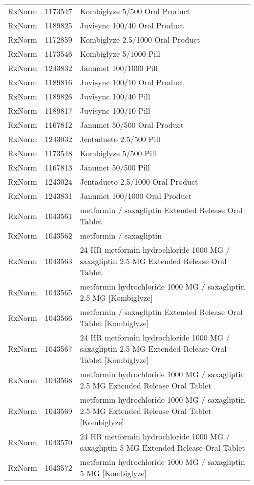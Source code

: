 \begin{longtable}{p{}p{}p{}}
  RxNorm & 1173547 & Kombiglyze 5/500 Oral Product \\ 
  RxNorm & 1189825 & Juvisync 100/40 Oral Product \\ 
  RxNorm & 1172859 & Kombiglyze 2.5/1000 Oral Product \\ 
  RxNorm & 1173546 & Kombiglyze 5/1000 Pill \\ 
  RxNorm & 1243832 & Janumet 100/1000 Pill \\ 
  RxNorm & 1189816 & Juvisync 100/10 Oral Product \\ 
  RxNorm & 1189826 & Juvisync 100/40 Pill \\ 
  RxNorm & 1189817 & Juvisync 100/10 Pill \\ 
  RxNorm & 1167812 & Janumet 50/500 Oral Product \\ 
  RxNorm & 1243032 & Jentadueto 2.5/500 Pill \\ 
  RxNorm & 1173548 & Kombiglyze 5/500 Pill \\ 
  RxNorm & 1167813 & Janumet 50/500 Pill \\ 
  RxNorm & 1243024 & Jentadueto 2.5/1000 Oral Product \\ 
  RxNorm & 1243831 & Janumet 100/1000 Oral Product \\ 
  RxNorm & 1043561 & metformin / saxagliptin Extended Release Oral Tablet \\ 
  RxNorm & 1043562 & metformin / saxagliptin \\ 
  RxNorm & 1043563 & 24 HR metformin hydrochloride 1000 MG / saxagliptin 2.5 MG Extended Release Oral Tablet \\ 
  RxNorm & 1043565 & metformin hydrochloride 1000 MG / saxagliptin 2.5 MG [Kombiglyze] \\ 
  RxNorm & 1043566 & metformin / saxagliptin Extended Release Oral Tablet [Kombiglyze] \\ 
  RxNorm & 1043567 & 24 HR metformin hydrochloride 1000 MG / saxagliptin 2.5 MG Extended Release Oral Tablet [Kombiglyze] \\ 
  RxNorm & 1043568 & metformin hydrochloride 1000 MG / saxagliptin 2.5 MG Extended Release Oral Tablet \\ 
  RxNorm & 1043569 & metformin hydrochloride 1000 MG / saxagliptin 2.5 MG Extended Release Oral Tablet [Kombiglyze] \\ 
  RxNorm & 1043570 & 24 HR metformin hydrochloride 1000 MG / saxagliptin 5 MG Extended Release Oral Tablet \\ 
  RxNorm & 1043572 & metformin hydrochloride 1000 MG / saxagliptin 5 MG [Kombiglyze] \\ 

\end{longtable}
